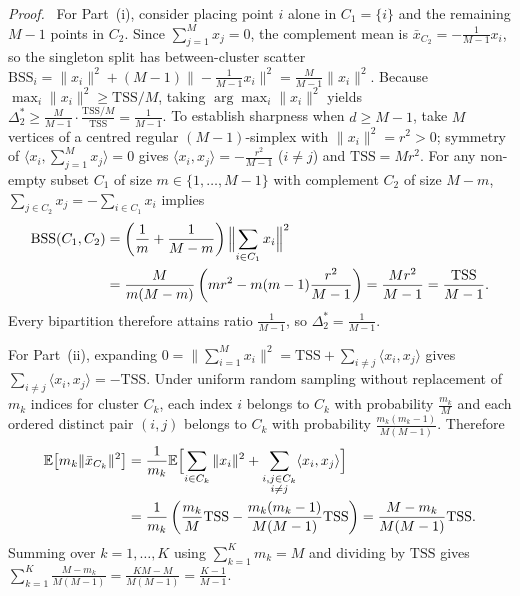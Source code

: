 \documentclass[11pt]{article}
\newenvironment{proof}[1][Proof]{\par\noindent\textit{#1.}\ }{\nobreak\hspace*{\fill}\begingroup\setlength{\fboxsep}{0pt}\fbox{\rule{0pt}{0.52em}\hspace{0.52em}}\endgroup\par\smallskip}
\begin{document}
\begin{proof}
For Part~(i), consider placing point $i$ alone in $C_1=\{i\}$ and the remaining
$M-1$ points in $C_2$. Since $\sum_{j=1}^M x_j=0$, the complement mean is
$\bar x_{C_2}=-\frac{1}{M-1}x_i$, so the singleton split has between-cluster
scatter
$\mathrm{BSS}_i=\|x_i\|^2+(M-1)\bigl\|-\tfrac{1}{M-1}x_i\bigr\|^2=\frac{M}{M-1}\|x_i\|^2$.
Because $\max_i\|x_i\|^2\ge\mathrm{TSS}/M$, taking $\arg\max_i\|x_i\|^2$ yields
$\Delta_2^{*}\ge\frac{M}{M-1}\cdot\frac{\mathrm{TSS}/M}{\mathrm{TSS}}=\frac{1}{M-1}$.
To establish sharpness when $d\ge M-1$, take $M$ vertices of a centred regular
$(M-1)$-simplex with $\|x_i\|^2=r^2>0$; symmetry of $\langle x_i,\sum_{j=1}^M x_j\rangle=0$
gives $\langle x_i,x_j\rangle=-\frac{r^2}{M-1}$ ($i\neq j$) and $\mathrm{TSS}=Mr^2$.
For any non-empty subset $C_1$ of size $m\in\{1,\dots,M-1\}$ with complement
$C_2$ of size $M-m$, $\sum_{j\in C_2}x_j=-\sum_{i\in C_1}x_i$ implies
\begin{equation*}
\begin{aligned}
\mathrm{BSS}(C_1,C_2)
&=\left(\frac1m+\frac1{M-m}\right)\Bigl\|\sum_{i\in C_1}x_i\Bigr\|^2 \\
&=\frac{M}{m(M-m)}\left(mr^2-m(m-1)\frac{r^2}{M-1}\right)
=\frac{M r^2}{M-1}=\frac{\mathrm{TSS}}{M-1}.
\end{aligned}
\end{equation*}
Every bipartition therefore attains ratio $\frac{1}{M-1}$, so $\Delta_2^{*}=\frac{1}{M-1}$.

For Part~(ii), expanding $0=\|\sum_{i=1}^M x_i\|^2=\mathrm{TSS}+\sum_{i\neq j}\langle x_i,x_j\rangle$
gives $\sum_{i\neq j}\langle x_i,x_j\rangle=-\mathrm{TSS}$. Under uniform random
sampling without replacement of $m_k$ indices for cluster $C_k$, each index $i$
belongs to $C_k$ with probability $\frac{m_k}{M}$ and each ordered distinct pair
$(i,j)$ belongs to $C_k$ with probability $\frac{m_k(m_k-1)}{M(M-1)}$. Therefore
\begin{equation*}
\begin{aligned}
\mathbb E\bigl[m_k\|\bar x_{C_k}\|^2\bigr]
&=\frac1{m_k}\mathbb E\Bigl[\sum_{i\in C_k}\|x_i\|^2+\sum_{\substack{i,j\in C_k\\i\neq j}}\langle x_i,x_j\rangle\Bigr] \\
&=\frac1{m_k}\left(\frac{m_k}{M}\mathrm{TSS}-\frac{m_k(m_k-1)}{M(M-1)}\mathrm{TSS}\right)
=\frac{M-m_k}{M(M-1)}\mathrm{TSS}.
\end{aligned}
\end{equation*}
Summing over $k=1,\dots,K$ using $\sum_{k=1}^K m_k=M$ and dividing by
$\mathrm{TSS}$ gives $\sum_{k=1}^K\frac{M-m_k}{M(M-1)}=\frac{KM-M}{M(M-1)}=\frac{K-1}{M-1}$.
\end{proof}
\end{document}
